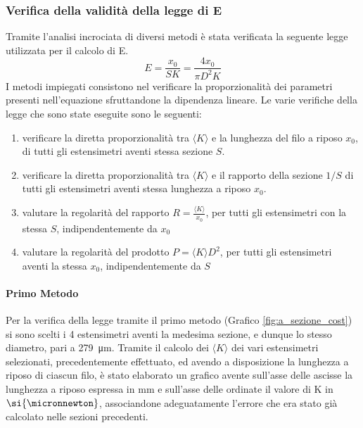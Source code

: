 \documentclass[a4paper,11pt,oneside]{article}
\begin{document}
\subsubsection*{Verifica della validità della legge di E}
Tramite l'analisi incrociata di diversi metodi è stata verificata la seguente legge utilizzata per il calcolo di E.
\begin{equation}
    \label{equation:legge_e}
    E=\frac{x_0}{S K}=\frac{4 x_0}{\pi D^{2}K}
\end{equation}
I metodi impiegati consistono nel verificare la proporzionalità dei parametri presenti nell'equazione sfruttandone la dipendenza lineare. Le varie verifiche della legge che sono state eseguite sono le seguenti:
\begin{enumerate}
    \item verificare la diretta proporzionalità tra $\langle K \rangle$ e la lunghezza del filo a riposo $x_0$, di tutti gli estensimetri aventi stessa sezione $S$.
    \item verificare la diretta proporzionalità tra $\langle K \rangle$ e il rapporto della sezione $1/S$ di tutti gli estensimetri aventi stessa lunghezza a riposo $x_{0}$.
    \item valutare la regolarità del rapporto $R=\frac{\langle K \rangle}{x_{0}}$, per tutti gli estensimetri con la stessa $S$, indipendentemente da $x_{0}$
    \item valutare la regolarità del prodotto $P={ \langle K \rangle} D^2 $, per tutti gli estensimetri aventi la stessa $x_{0}$, indipendentemente da $S$
\end{enumerate}
\paragraph{Primo Metodo}
Per la verifica della legge tramite il primo metodo (Grafico \ref{fig:a_sezione_cost}) si sono scelti i 4  estensimetri aventi la medesima sezione, e dunque lo stesso diametro, pari a \SI{279}{\micro\meter}. Tramite il calcolo dei $\langle K \rangle$ dei vari estensimetri selezionati, precedentemente effettuato, ed avendo a disposizione la lunghezza a riposo di ciascun filo, è stato elaborato un grafico avente sull'asse delle ascisse la lunghezza a riposo espressa in $\si{\milli\meter}$ e sull'asse delle ordinate il valore di K in $\si{\micronnewton}$, associandone adeguatamente l'errore che era stato già calcolato nelle sezioni precedenti.
\end{document}
